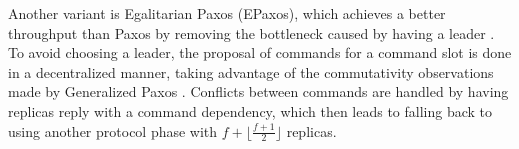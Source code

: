 Another variant is Egalitarian Paxos (EPaxos), which achieves a better throughput than Paxos by removing the bottleneck caused by having a leader \cite{Moraru2013}. To avoid choosing a leader, the proposal of commands for a command slot is done in a decentralized manner, taking advantage of the commutativity observations made by Generalized Paxos \cite{Lamport2005}. Conflicts between commands are handled by having replicas reply with a command dependency, which then leads to falling back to using another protocol phase with $f+\lfloor\frac{f+1}{2}\rfloor$ replicas.



